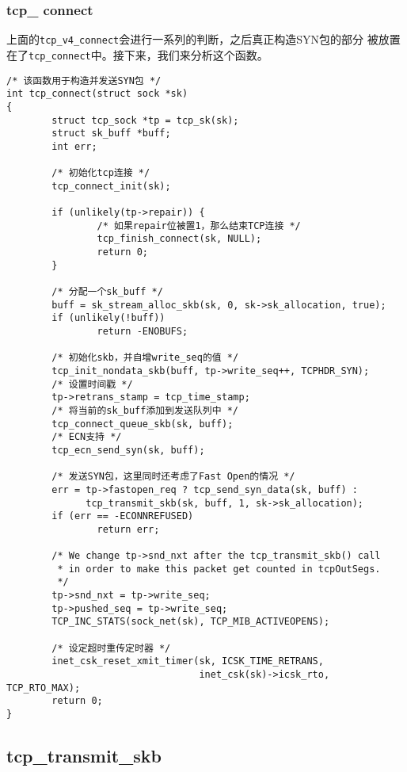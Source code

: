\documentclass[11pt, a4paper,oneside]{book}
\theoremstyle{ocrenumbox}
\theoremstyle{purplenumbox}
\theoremstyle{blackbox}
\begin{document}
\subsubsection{tcp\_ connect}
上面的\texttt{tcp_v4_connect}会进行一系列的判断，之后真正构造SYN包的部分
被放置在了\texttt{tcp_connect}中。接下来，我们来分析这个函数。

\begin{verbatim}
/* 该函数用于构造并发送SYN包 */
int tcp_connect(struct sock *sk)
{
        struct tcp_sock *tp = tcp_sk(sk);
        struct sk_buff *buff;
        int err;

        /* 初始化tcp连接 */
        tcp_connect_init(sk);

        if (unlikely(tp->repair)) {
                /* 如果repair位被置1，那么结束TCP连接 */
                tcp_finish_connect(sk, NULL);
                return 0;
        }

        /* 分配一个sk_buff */
        buff = sk_stream_alloc_skb(sk, 0, sk->sk_allocation, true);
        if (unlikely(!buff))
                return -ENOBUFS;

        /* 初始化skb，并自增write_seq的值 */
        tcp_init_nondata_skb(buff, tp->write_seq++, TCPHDR_SYN);
        /* 设置时间戳 */
        tp->retrans_stamp = tcp_time_stamp;
        /* 将当前的sk_buff添加到发送队列中 */
        tcp_connect_queue_skb(sk, buff);
        /* ECN支持 */
        tcp_ecn_send_syn(sk, buff);

        /* 发送SYN包，这里同时还考虑了Fast Open的情况 */
        err = tp->fastopen_req ? tcp_send_syn_data(sk, buff) :
              tcp_transmit_skb(sk, buff, 1, sk->sk_allocation);
        if (err == -ECONNREFUSED)
                return err;

        /* We change tp->snd_nxt after the tcp_transmit_skb() call
         * in order to make this packet get counted in tcpOutSegs.
         */
        tp->snd_nxt = tp->write_seq;
        tp->pushed_seq = tp->write_seq;
        TCP_INC_STATS(sock_net(sk), TCP_MIB_ACTIVEOPENS);

        /* 设定超时重传定时器 */
        inet_csk_reset_xmit_timer(sk, ICSK_TIME_RETRANS,
                                  inet_csk(sk)->icsk_rto, TCP_RTO_MAX);
        return 0;
}
\end{verbatim}

\subsection{tcp\_transmit\_skb}
\end{document}
